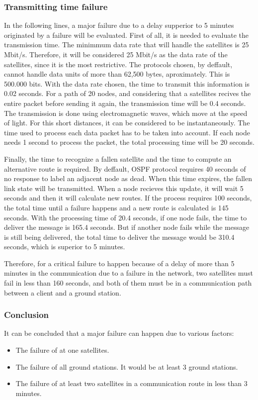 \subsubsection{Transmitting time failure}
In the following lines, a major failure due to a delay supperior to 5 minutes originated by a failure will be evaluated. First of all, it is needed to evaluate the transmission time. The minimmum data rate that will handle the satellites is 25 Mbit/s. Therefore, it will be considered 25 Mbit/s as the data rate of the satellites, since it is the most restrictive. The protocols chosen, by deffault, cannot handle data units of more than 62,500 bytes, aproximately. This is 500.000 bits. With the data rate chosen, the time to transmit this information is 0.02 seconds. For a path of 20 nodes, and considering that a satellites recives the entire packet before sending it again, the transmission time will be 0.4 seconds. The transmission is done using electromagnetic waves, which move at the speed of light. For this short distances, it can be considered to be instantaneously. The time used to process each data packet has to be taken into account. If each node needs 1 second to process the packet, the total processing time will be 20 seconds. 

Finally, the time to recognize a fallen satellite and the time to compute an alternative route is required. By deffault, OSPF protocol requires 40 seconds of no response to label an adjacent node as dead. When this time expires, the fallen link state will be transmitted. When a node recieves this update, it will wait 5 seconds and then it will calculate new routes. If the process requires 100 seconds, the total time until a failure happens and a new route is calculated is 145 seconds. With the processing time of 20.4 seconds, if one node fails, the time to deliver the message is 165.4 seconds. But if another node fails while the message is still being delivered, the total time to deliver the message would be 310.4 seconds, which is superior to 5 minutes.

Therefore, for a critical failure to happen because of a delay of more than 5 minutes in the communication due to a failure in the network, two satellites must fail in less than 160 seconds, and both of them must be in a communication path between a client and a ground station.

\subsubsection{Conclusion}
It can be concluded that a major failure can happen due to various factors:
\begin{itemize}
\item The failure of at one satellites.
\item The failure of all ground stations. It would be at least 3 ground stations.
\item The failure of at least two satellites in a communication route in less than 3 minutes.
\end{itemize}